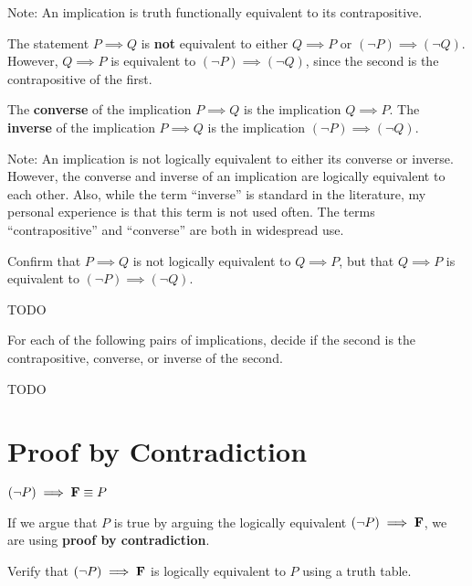 Note:  An implication is truth functionally equivalent to its contrapositive.


The statement $P \implies Q$ is \textbf{not} equivalent to either $Q \implies P$ or  $(\neg P) \implies (\neg Q)$.  However, $Q \implies P$ is equivalent to   $(\neg P) \implies (\neg Q)$,  since the second is the contrapositive of the first.



\begin{definition}
		The \textbf{converse} of the implication $P \implies Q$ is the implication $Q \implies P$.  The \textbf{inverse} of the implication $P \implies Q$ is the implication $(\neg P) \implies (\neg Q)$.  
	\end{definition}

Note:  An implication is not logically equivalent to either its converse or inverse.  However, the converse and inverse of an implication are logically equivalent to each other.  Also, while the term ``inverse'' is standard in the literature, my personal experience is that this term is not used often.  The terms ``contrapositive'' and ``converse'' are both in widespread use.

\begin{xca}
	Confirm that $P \implies Q$ is not logically equivalent to $Q \implies P$, but that $Q \implies P$ is equivalent to $(\neg P) \implies (\neg Q)$.
\end{xca}

\begin{solutions}
TODO
\end{solutions}


\begin{xca}
		For each of the following pairs of implications, decide if the second is the contrapositive, converse, or inverse of the second.
		
		TODO	
\end{xca}


\section{Proof by Contradiction}

\begin{theorem}
		$(\neg P) \implies \textbf{\textrm{F}} \equiv P$
	\end{theorem}

If we argue that $P$ is true by arguing the logically equivalent $(\neg P ) \implies \textbf{\textrm{F}}$, we are using \textbf{proof by contradiction}.
\begin{xca}
		Verify that $(\neg P) \implies \textbf{\textrm{F}}$ is logically equivalent to  $P$ using a truth table.
	\end{xca}


